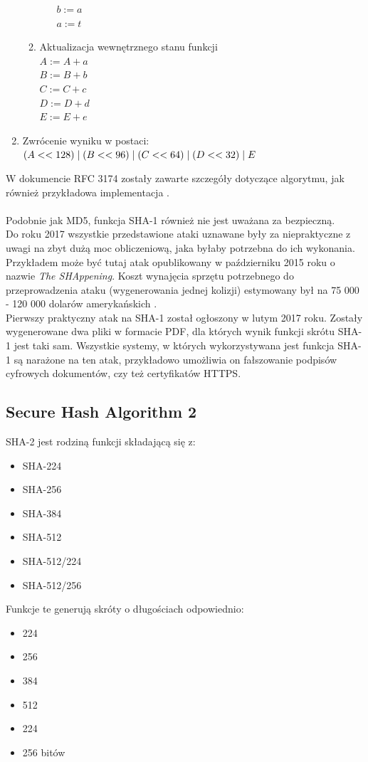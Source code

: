 \begin{enumerate}
\begin{enumerate}
\begin{enumerate}
				        $b := a$ \\
				        $a := t$
				\end{enumerate}
			\item Aktualizacja wewnętrznego stanu funkcji \\
				$A := A + a$ \\
				$B := B + b$ \\
				$C := C + c$ \\
				$D := D + d$ \\
				$E := E + e$
		\end{enumerate}
	\item Zwrócenie wyniku w postaci: \\
		$(A << 128) \mathrel{|} (B << 96) \mathrel{|} (C << 64) \mathrel{|} (D << 32) \mathrel{|} E$
\end{enumerate}
W dokumencie RFC 3174 zostały zawarte szczegóły dotyczące algorytmu, jak również przykładowa implementacja \cite{sha1rfc}. \\ \\
Podobnie jak MD5, funkcja SHA-1 również nie jest uważana za bezpieczną. \\
Do roku 2017 wszystkie przedstawione ataki uznawane były za niepraktyczne z uwagi na zbyt dużą moc obliczeniową, jaka byłaby potrzebna do ich wykonania.
Przykładem może być tutaj atak opublikowany w październiku 2015 roku o nazwie \textit{The SHAppening}. Koszt wynajęcia sprzętu potrzebnego do przeprowadzenia ataku (wygenerowania jednej kolizji) estymowany był na 75 000 - 120 000 dolarów amerykańskich \cite{shap}. \\
Pierwszy praktyczny atak na SHA-1 został ogłoszony w lutym 2017 roku. Zostały wygenerowane dwa pliki w formacie PDF, dla których wynik funkcji skrótu SHA-1 jest taki sam. Wszystkie systemy, w których wykorzystywana jest funkcja SHA-1 są narażone na ten atak, przykładowo umożliwia on fałszowanie podpisów cyfrowych dokumentów, czy też certyfikatów HTTPS. \cite{shatt}

\subsection{Secure Hash Algorithm 2}
SHA-2 jest rodziną funkcji składającą się z:
\begin{itemize}
	\item \mbox{SHA-224}
	\item \mbox{SHA-256}
	\item \mbox{SHA-384}
	\item \mbox{SHA-512}
	\item \mbox{SHA-512/224}
	\item \mbox{SHA-512/256} \\
\end{itemize} 
Funkcje te generują skróty o długościach odpowiednio: 
\begin{itemize}
	\item 224
	\item 256
	\item 384
	\item 512
	\item 224
	\item 256 bitów
\end{itemize} 

